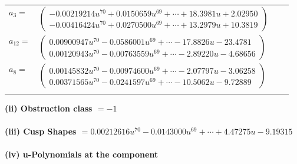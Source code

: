 \documentclass[1p]{elsarticle_modified}
\theoremstyle{definition}
\begin{document}
\begin{tabular}{m{7pt} m{180pt} m{7pt} m{180pt} }
\flushright $a_{3}=$&$\begin{pmatrix}-0.00219214 u^{70}+0.0150659 u^{69}+\cdots+18.3981 u+2.02950\\-0.00416424 u^{70}+0.0270500 u^{69}+\cdots+13.2979 u+10.3819\end{pmatrix}$ \\
\flushright $a_{12}=$&$\begin{pmatrix}0.00900947 u^{70}-0.0586001 u^{69}+\cdots-17.8826 u-23.4781\\0.00120943 u^{70}-0.00763559 u^{69}+\cdots-2.89220 u-4.68656\end{pmatrix}$ \\
\flushright $a_{8}=$&$\begin{pmatrix}0.00145832 u^{70}-0.00974600 u^{69}+\cdots-2.07797 u-3.06258\\0.00371565 u^{70}-0.0241597 u^{69}+\cdots-10.5062 u-9.72889\end{pmatrix}$\\&\end{tabular}
\flushleft \textbf{(ii) Obstruction class $= -1$}\\~\\
\flushleft \textbf{(iii) Cusp Shapes $= 0.00212616 u^{70}-0.0143000 u^{69}+\cdots+4.47275 u-9.19315$}\\~\\
\newpage\renewcommand{\arraystretch}{1}
\flushleft \textbf{(iv) u-Polynomials at the component}\newline \\
\end{document}
